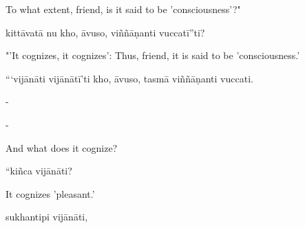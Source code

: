 \begin{samepage}
\begin{leftcolumn*}
To what extent, friend, is it said to be 'consciousness'?"
\end{leftcolumn*}

\begin{rightcolumn}
kittāvatā nu kho, āvuso, viññāṇanti vuccatī”ti?
\end{rightcolumn}
\end{samepage}

\begin{samepage}
\begin{leftcolumn*}
"'It cognizes, it cognizes': Thus, friend, it is said to be 'consciousness.'
\end{leftcolumn*}

\begin{rightcolumn}
“‘vijānāti vijānātī’ti kho, āvuso, tasmā viññāṇanti vuccati.
\end{rightcolumn}
\end{samepage}

\begin{samepage}
\begin{leftcolumn*}
-
\end{leftcolumn*}

\begin{rightcolumn}
-
\end{rightcolumn}
\end{samepage}

\begin{samepage}
\begin{leftcolumn*}
And what does it cognize?
\end{leftcolumn*}

\begin{rightcolumn}
“kiñca vijānāti?
\end{rightcolumn}
\end{samepage}

\begin{samepage}
\begin{leftcolumn*}
It cognizes 'pleasant.'
\end{leftcolumn*}

\begin{rightcolumn}
sukhantipi vijānāti,
\end{rightcolumn}
\end{samepage}

